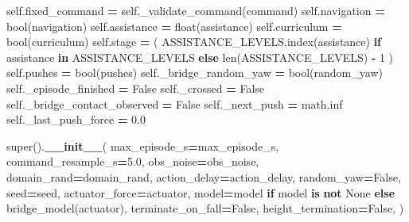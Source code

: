 \documentclass[
  american,
  11pt,
  letterpaper,
]{article}
\newenvironment{Shaded}{\begin{snugshade}}{\end{snugshade}}
\newcommand{\BuiltInTok}[1]{#1}
\newcommand{\ControlFlowTok}[1]{\textcolor[rgb]{0.13,0.29,0.53}{\textbf{#1}}}
\newcommand{\DecValTok}[1]{\textcolor[rgb]{0.00,0.00,0.81}{#1}}
\newcommand{\FloatTok}[1]{\textcolor[rgb]{0.00,0.00,0.81}{#1}}
\newcommand{\FunctionTok}[1]{\textcolor[rgb]{0.13,0.29,0.53}{\textbf{#1}}}
\newcommand{\KeywordTok}[1]{\textcolor[rgb]{0.13,0.29,0.53}{\textbf{#1}}}
\newcommand{\NormalTok}[1]{#1}
\newcommand{\OperatorTok}[1]{\textcolor[rgb]{0.81,0.36,0.00}{\textbf{#1}}}
\newcommand{\VariableTok}[1]{\textcolor[rgb]{0.00,0.00,0.00}{#1}}
\renewenvironment{Shaded}{\par\smallskip}{\par\smallskip}
\begin{document}
\begin{Shaded}
\begin{Highlighting}[]
        \VariableTok{self}\NormalTok{.fixed\_command }\OperatorTok{=} \VariableTok{self}\NormalTok{.\_validate\_command(command)}
        \VariableTok{self}\NormalTok{.navigation }\OperatorTok{=} \BuiltInTok{bool}\NormalTok{(navigation)}
        \VariableTok{self}\NormalTok{.assistance }\OperatorTok{=} \BuiltInTok{float}\NormalTok{(assistance)}
        \VariableTok{self}\NormalTok{.curriculum }\OperatorTok{=} \BuiltInTok{bool}\NormalTok{(curriculum)}
        \VariableTok{self}\NormalTok{.stage }\OperatorTok{=}\NormalTok{ (}
\NormalTok{            ASSISTANCE\_LEVELS.index(assistance)}
            \ControlFlowTok{if}\NormalTok{ assistance }\KeywordTok{in}\NormalTok{ ASSISTANCE\_LEVELS}
            \ControlFlowTok{else} \BuiltInTok{len}\NormalTok{(ASSISTANCE\_LEVELS) }\OperatorTok{{-}} \DecValTok{1}
\NormalTok{        )}
        \VariableTok{self}\NormalTok{.pushes }\OperatorTok{=} \BuiltInTok{bool}\NormalTok{(pushes)}
        \VariableTok{self}\NormalTok{.\_bridge\_random\_yaw }\OperatorTok{=} \BuiltInTok{bool}\NormalTok{(random\_yaw)}
        \VariableTok{self}\NormalTok{.\_episode\_finished }\OperatorTok{=} \VariableTok{False}
        \VariableTok{self}\NormalTok{.\_crossed }\OperatorTok{=} \VariableTok{False}
        \VariableTok{self}\NormalTok{.\_bridge\_contact\_observed }\OperatorTok{=} \VariableTok{False}
        \VariableTok{self}\NormalTok{.\_next\_push }\OperatorTok{=}\NormalTok{ math.inf}
        \VariableTok{self}\NormalTok{.\_last\_push\_force }\OperatorTok{=} \FloatTok{0.0}

        \BuiltInTok{super}\NormalTok{().}\FunctionTok{\_\_init\_\_}\NormalTok{(}
\NormalTok{            max\_episode\_s}\OperatorTok{=}\NormalTok{max\_episode\_s,}
\NormalTok{            command\_resample\_s}\OperatorTok{=}\FloatTok{5.0}\NormalTok{,}
\NormalTok{            obs\_noise}\OperatorTok{=}\NormalTok{obs\_noise,}
\NormalTok{            domain\_rand}\OperatorTok{=}\NormalTok{domain\_rand,}
\NormalTok{            action\_delay}\OperatorTok{=}\NormalTok{action\_delay,}
\NormalTok{            random\_yaw}\OperatorTok{=}\VariableTok{False}\NormalTok{,}
\NormalTok{            seed}\OperatorTok{=}\NormalTok{seed,}
\NormalTok{            actuator\_force}\OperatorTok{=}\NormalTok{actuator,}
\NormalTok{            model}\OperatorTok{=}\NormalTok{model }\ControlFlowTok{if}\NormalTok{ model }\KeywordTok{is} \KeywordTok{not} \VariableTok{None} \ControlFlowTok{else}\NormalTok{ bridge\_model(actuator),}
\NormalTok{            terminate\_on\_fall}\OperatorTok{=}\VariableTok{False}\NormalTok{,}
\NormalTok{            height\_termination}\OperatorTok{=}\VariableTok{False}\NormalTok{,}
\NormalTok{        )}


\end{Highlighting}
\end{Shaded}
\end{document}
